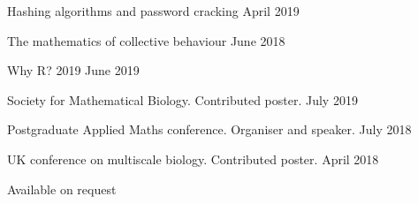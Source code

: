 \documentclass[12pt, a4paper]{article}
\begin{document}
%
     {Hashing algorithms and password cracking}%
     {April 2019}

%
     {The mathematics of collective behaviour}%
     {June 2018}




%
     {Why R? 2019}%
     {June 2019}%

%
     {Society for Mathematical Biology. Contributed poster.}%
     {July 2019}

%
     {Postgraduate Applied Maths conference. Organiser and speaker.}%
     {July 2018}

%
     {UK conference on multiscale biology. Contributed poster.}%
     {April 2018}





\vspace{2mm}

Available on request
\end{document}
